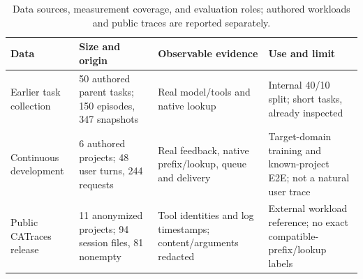 \begin{table}[t]
\centering\small
\caption{Data sources, measurement coverage, and evaluation roles; authored workloads and public traces are reported separately.}
\label{tab:workload-provenance}
\begin{tabular}{@{}p{}p{}p{}p{}@{}}
\toprule
Data & Size and origin & Observable evidence & Use and limit \\
\midrule
Earlier task collection & 50 authored parent tasks; 150 episodes, 347 snapshots & Real model/tools and native lookup & Internal 40/10 split; short tasks, already inspected \\
Continuous development & 6 authored projects; 48 user turns, 244 requests & Real feedback, native prefix/lookup, queue and delivery & Target-domain training and known-project E2E; not a natural user trace \\
Public CATraces release & 11 anonymized projects; 94 session files, 81 nonempty & Tool identities and log timestamps; content/arguments redacted & External workload reference; no exact compatible-prefix/lookup labels \\
\bottomrule
\end{tabular}
\end{table}
